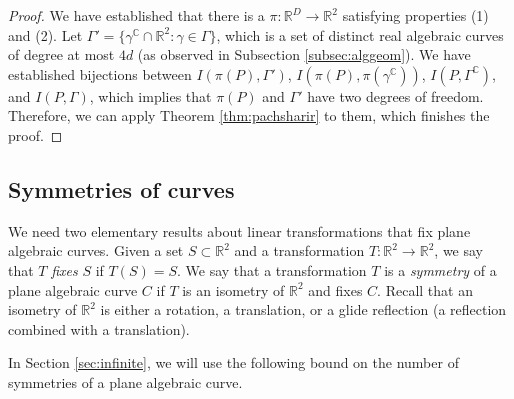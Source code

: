 \documentclass[12pt]{article}
\newcommand{\RR}{\mathbb R}
\newcommand{\CC}{\mathbb C}
\begin{document}
\begin{proof}
We have established that there is a $\pi:\RR^D\to\RR^2$ satisfying properties (1) and (2). 
 Let $\Gamma' = \{\gamma^\CC\cap \RR^2: \gamma\in \Gamma\}$, which is a set of distinct real algebraic curves of degree at most $4d$ (as observed in Subsection \ref{subsec:alggeom}). 
 We have established bijections between $I(\pi(P),\Gamma')$, $I(\pi(P), \pi(\gamma^\CC))$, $I(P,\Gamma^\CC)$, and $I(P,\Gamma)$,
 which implies that $\pi(P)$ and $\Gamma'$ have two degrees of freedom.
 Therefore, we can apply Theorem \ref{thm:pachsharir} to them, which finishes the proof.
\end{proof}



\subsection{Symmetries of curves}\label{subsec:symmetries}
We need two elementary results about linear transformations that fix plane algebraic curves.
Given a set $S\subset \mathbb{R}^2$ and a transformation $T:\mathbb{R}^2\to \mathbb{R}^2$,
we say that $T$ {\it fixes} $S$ if $T(S)= S$.
We say that a transformation $T$ is a {\it symmetry} of a plane algebraic curve $C$
if $T$ is an isometry of $\mathbb{R}^2$ and fixes $C$.
Recall that an isometry of $\mathbb{R}^2$ is either 
a rotation, a translation, or a glide reflection 
(a reflection combined with a translation).

In Section \ref{sec:infinite}, we will use the following bound 
on the number of symmetries of a plane algebraic curve.
\end{document}
